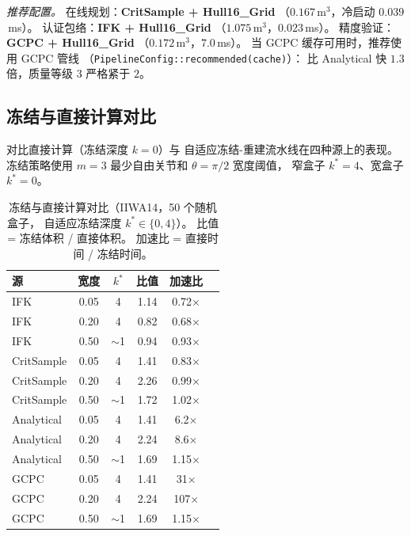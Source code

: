 \documentclass[journal]{IEEEtran}
\begin{document}
\emph{推荐配置。}
在线规划：\textbf{CritSample + Hull16\_Grid}
（$0.167$\,m$^3$，冷启动 $0.039$\,ms）。
认证包络：\textbf{IFK + Hull16\_Grid}
（$1.075$\,m$^3$，$0.023$\,ms）。
精度验证：\textbf{GCPC + Hull16\_Grid}
（$0.172$\,m$^3$，$7.0$\,ms）。
当 GCPC 缓存可用时，推荐使用 GCPC 管线
（\texttt{PipelineConfig::recommended(cache)}）：
比 Analytical 快 $1.3$ 倍，质量等级 $3$ 严格紧于 $2$。

\subsection{冻结与直接计算对比}\label{sec:exp_freeze}


对比直接计算（冻结深度 $k{=}0$）与
自适应冻结-重建流水线在四种源上的表现。
冻结策略使用 $m{=}3$ 最少自由关节和
$\theta{=}\pi/2$ 宽度阈值，
窄盒子 $k^*{=}4$、宽盒子 $k^*{=}0$。

\begin{table}[t]
\centering
\caption{冻结与直接计算对比（IIWA14，50 个随机盒子，
自适应冻结深度 $k^*{\in}\{0,4\}$）。
比值 = 冻结体积 / 直接体积。
加速比 = 直接时间 / 冻结时间。}
\label{tab:freeze}
\setlength{\tabcolsep}{3pt}
\small
\begin{tabular}{@{}lccccc@{}}
\toprule
源 & 宽度 & $k^*$ & 比值 & 加速比 \\
\midrule
IFK         & 0.05 & 4 & 1.14 & 0.72$\times$ \\
IFK         & 0.20 & 4 & 0.82 & 0.68$\times$ \\
IFK         & 0.50 & $\sim$1 & 0.94 & 0.93$\times$ \\
\midrule
CritSample  & 0.05 & 4 & 1.41 & 0.83$\times$ \\
CritSample  & 0.20 & 4 & 2.26 & 0.99$\times$ \\
CritSample  & 0.50 & $\sim$1 & 1.72 & 1.02$\times$ \\
\midrule
Analytical  & 0.05 & 4 & 1.41 & 6.2$\times$ \\
Analytical  & 0.20 & 4 & 2.24 & 8.6$\times$ \\
Analytical  & 0.50 & $\sim$1 & 1.69 & 1.15$\times$ \\
\midrule
GCPC        & 0.05 & 4 & 1.41 & 31$\times$ \\
GCPC        & 0.20 & 4 & 2.24 & 107$\times$ \\
GCPC        & 0.50 & $\sim$1 & 1.69 & 1.15$\times$ \\
\bottomrule
\end{tabular}
\end{table}
\end{document}
